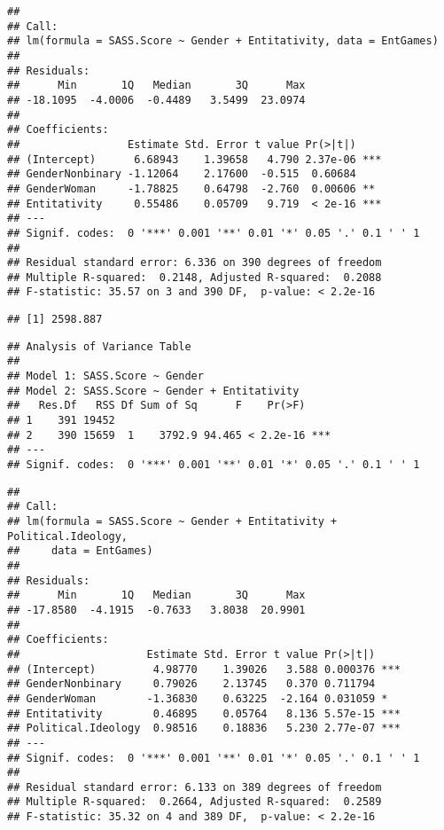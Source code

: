 \documentclass[
  doc,draftall]{apa6}
\begin{document}
\begin{verbatim}
## 
## Call:
## lm(formula = SASS.Score ~ Gender + Entitativity, data = EntGames)
## 
## Residuals:
##      Min       1Q   Median       3Q      Max 
## -18.1095  -4.0006  -0.4489   3.5499  23.0974 
## 
## Coefficients:
##                 Estimate Std. Error t value Pr(>|t|)    
## (Intercept)      6.68943    1.39658   4.790 2.37e-06 ***
## GenderNonbinary -1.12064    2.17600  -0.515  0.60684    
## GenderWoman     -1.78825    0.64798  -2.760  0.00606 ** 
## Entitativity     0.55486    0.05709   9.719  < 2e-16 ***
## ---
## Signif. codes:  0 '***' 0.001 '**' 0.01 '*' 0.05 '.' 0.1 ' ' 1
## 
## Residual standard error: 6.336 on 390 degrees of freedom
## Multiple R-squared:  0.2148, Adjusted R-squared:  0.2088 
## F-statistic: 35.57 on 3 and 390 DF,  p-value: < 2.2e-16
\end{verbatim}

\begin{verbatim}
## [1] 2598.887
\end{verbatim}

\begin{verbatim}
## Analysis of Variance Table
## 
## Model 1: SASS.Score ~ Gender
## Model 2: SASS.Score ~ Gender + Entitativity
##   Res.Df   RSS Df Sum of Sq      F    Pr(>F)    
## 1    391 19452                                  
## 2    390 15659  1    3792.9 94.465 < 2.2e-16 ***
## ---
## Signif. codes:  0 '***' 0.001 '**' 0.01 '*' 0.05 '.' 0.1 ' ' 1
\end{verbatim}

\begin{verbatim}
## 
## Call:
## lm(formula = SASS.Score ~ Gender + Entitativity + Political.Ideology, 
##     data = EntGames)
## 
## Residuals:
##      Min       1Q   Median       3Q      Max 
## -17.8580  -4.1915  -0.7633   3.8038  20.9901 
## 
## Coefficients:
##                    Estimate Std. Error t value Pr(>|t|)    
## (Intercept)         4.98770    1.39026   3.588 0.000376 ***
## GenderNonbinary     0.79026    2.13745   0.370 0.711794    
## GenderWoman        -1.36830    0.63225  -2.164 0.031059 *  
## Entitativity        0.46895    0.05764   8.136 5.57e-15 ***
## Political.Ideology  0.98516    0.18836   5.230 2.77e-07 ***
## ---
## Signif. codes:  0 '***' 0.001 '**' 0.01 '*' 0.05 '.' 0.1 ' ' 1
## 
## Residual standard error: 6.133 on 389 degrees of freedom
## Multiple R-squared:  0.2664, Adjusted R-squared:  0.2589 
## F-statistic: 35.32 on 4 and 389 DF,  p-value: < 2.2e-16
\end{verbatim}
\end{document}
